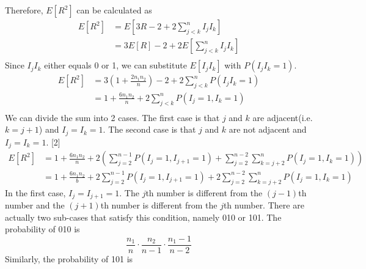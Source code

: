 \documentclass[a4paper,12pt]{article}
\begin{document}
\noindent Therefore, $E[R^2]$ can be calculated as
\begin{equation*}
\begin{aligned}
E \left[ R ^ { 2 } \right] & = E \left[ 3 R - 2 + 2 \sum _ { j < k } ^ { n } I _ { j } I _ { k } \right] \\ & = 3 E [ R ] - 2 + 2 E \left[ \sum _ { j < k } ^ { n } I _ { j } I _ { k } \right] \\  \end{aligned}
\end{equation*}
Since $I_j I_k$ either equals 0 or 1, we can substitute $E[I_j I_k]$ with $P(I_j I_k=1)$.
\begin{equation*}
\begin{aligned}
E[R^2]& = 3 \left( 1 + \frac { 2 n_1 n_2 } { n } \right) - 2 + 2 \sum _ { j < k } ^ { n } P \left( I _ { j } I _ { k } = 1 \right) \\ & = 1 + \frac { 6 n_1 n_2 } { n } + 2 \sum _ { j < k } ^ { n } P \left( I _ { j } = 1 , I _ { k } = 1 \right) \\
\end{aligned}
\end{equation*}
We can divide the sum into 2 cases. The first case is that $j$ and $k$ are adjacent(i.e. $k=j+1$) and $I_j = I_k=1$. The second case is that $j$ and $k$ are not adjacent and $I_j=I_k=1$. [2]
\begin{equation}\label{3.2.2.4}
\begin{aligned}
E[R^2] & = 1 + \frac { 6 n_1 n_2 } { n } + 2 \left( \sum _ { j = 2 } ^ { n-1 } P \left( I _ { j } = 1 , I _ { j + 1 } = 1 \right) + \sum _ { j = 2 } ^ { n-2 } \sum _ { k = j + 2 } ^ { n } P \left( I _ { j } = 1 , I _ { k } = 1 \right) \right) \\
&  = 1 + \frac { 6 n_1 n_2 } { b } + 2 \sum _ { j = 2 } ^ { n-1 } P \left( I _ { j } = 1 , I _ { j + 1 } = 1 \right) + 2 \sum _ { j = 2 } ^ {n-2 } \sum _ { k = j + 2 } ^ { n } P \left( I _ { j } = 1 , I _ { k } = 1 \right)  \end{aligned}
\end{equation}
In the first case, $I_j=I_{j+1}=1$. The $j$th number is different from the $(j-1)$th number  and the  $(j+1)$th number is different from the $j$th number. There are actually two sub-cases that satisfy this condition, namely 010 or 101. The probability of 010 is
\begin{equation*}
\frac { n_1 } { n } \cdot \frac { n_2 } { n - 1 } \cdot \frac { n_1 - 1 } { n - 2 }
\end{equation*}
Similarly, the probability of 101 is
\end{document}
